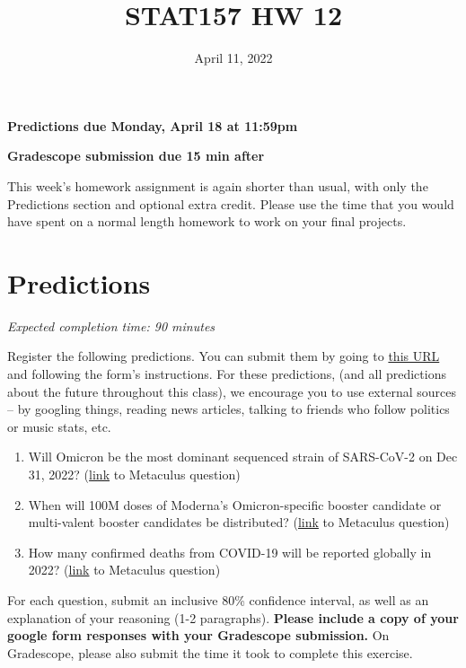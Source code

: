 \documentclass[11pt]{article}
\title{STAT157 HW 12}
\date{April 11, 2022}
\begin{document}
\maketitle

\hfill \textbf{Predictions due Monday, April 18 at 11:59pm}

\hfill \textbf{Gradescope submission due 15 min after}

This week's homework assignment is again shorter than usual, with only the Predictions section and optional extra credit. Please use the time that you would have spent on a normal length homework to work on your final projects.


\section*{Predictions}

\emph{Expected completion time: 90 minutes}

Register the following predictions. You can submit them by going to \href{https://docs.google.com/forms/d/e/1FAIpQLSeMnjW4dLgLBFrIVr0n4-KjeakEj00KlN4PCfIRmHAvGj95kQ/viewform?usp=sf_link}{this URL} and following the form's instructions. For these predictions, (and all predictions about the future throughout this class), we encourage you to use external sources -- by googling things, reading news articles, talking to friends who follow politics or music stats, etc.

\begin{enumerate}
	\item Will Omicron be the most dominant sequenced strain of SARS-CoV-2 on Dec 31, 2022? (\href{https://www.metaculus.com/questions/8880/omicron-dominant-variant-dec-31-2022/}{link} to Metaculus question)
	\item When will 100M doses of Moderna's Omicron-specific booster candidate or multi-valent booster candidates be distributed? (\href{https://www.metaculus.com/questions/8767/date-100m-doses-omicron-booster-distributed/}{link} to Metaculus question)
	\item How many confirmed deaths from COVID-19 will be reported globally in 2022? (\href{https://www.metaculus.com/questions/8307/global-confirmed-covid-19-deaths-in-2022/}{link} to Metaculus question)
\end{enumerate}

For each question, submit an inclusive 80\% confidence interval, as well as an explanation of your reasoning (1-2 paragraphs). \textbf{Please include a copy of your google form responses with your Gradescope submission.} On Gradescope, please also submit the time it took to complete this exercise.
\end{document}
